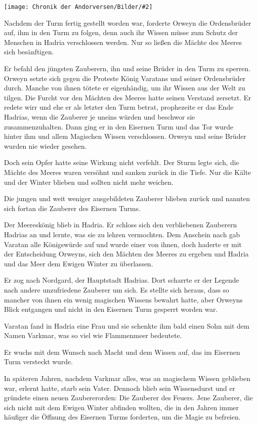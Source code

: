 \documentclass[10pt, a4paper, oneside]{book}
\newcommand{\bildmitts}[2][height=0.32\textwidth,width=0.48\textwidth,keepaspectratio]{%
    \begin{center}
        \texttt{[image: Chronik der Andorversen/Bilder/\#2]}
    \end{center}
}
\begin{document}
\begin{multicols}{2}
\bildmitts{Die Zwei Orden Bild 1.jpg}

Nachdem der Turm fertig gestellt worden war, forderte Orweyn die Ordensbrüder auf, ihm in den Turm zu folgen, denn auch ihr Wissen müsse zum Schutz der Menschen in Hadria verschlossen werden. Nur so ließen die Mächte des Meeres sich besänftigen.\bigskip

Er befahl den jüngsten Zauberern, ihn und seine Brüder in den Turm zu sperren. Orweyn setzte sich gegen die Proteste König Varatans und seiner Ordensbrüder durch. Manche von ihnen tötete er eigenhändig, um ihr Wissen aus der Welt zu tilgen. Die Furcht vor den Mächten des Meeres hatte seinen Verstand zersetzt. Er redete wirr und ehe er als letzter den Turm betrat, prophezeite er das Ende Hadrias, wenn die Zauberer je uneins würden und beschwor sie zusammenzuhalten. Dann ging er in den Eisernen Turm und das Tor wurde hinter ihm und allem Magischen Wissen verschlossen. Orweyn und seine Brüder wurden nie wieder gesehen.\bigskip

Doch sein Opfer hatte seine Wirkung nicht verfehlt. Der Sturm legte sich, die Mächte des Meeres waren versöhnt und sanken zurück in die Tiefe. Nur die Kälte und der Winter blieben und sollten nicht mehr weichen.\bigskip

Die jungen und weit weniger ausgebildeten Zauberer blieben zurück und nannten sich fortan die Zauberer des Eisernen Turms.\bigskip

Der Meereskönig blieb in Hadria. Er schloss sich den verbliebenen Zauberern Hadrias an und lernte, was sie zu lehren vermochten. Dem Anschein nach gab Varatan alle Königswürde auf und wurde einer von ihnen, doch haderte er mit der Entscheidung Orweyns, sich den Mächten des Meeres zu ergeben und Hadria und das Meer dem Ewigen Winter zu überlassen.\bigskip

Er zog nach Nordgard, der Hauptstadt Hadrias. Dort scharrte er der Legende nach andere unzufriedene Zauberer um sich. Es stellte sich heraus, dass so mancher von ihnen ein wenig magischen Wissens bewahrt hatte, aber Orweyns Blick entgangen  und nicht in den Eisernen Turm gesperrt worden war.\bigskip

Varatan fand in Hadria eine Frau und sie schenkte ihm bald einen Sohn mit dem Namen Varkmar, was so viel wie Flammenmeer bedeutete.\bigskip

Er wuchs mit dem Wunsch nach Macht und dem Wissen auf, das im Eisernen Turm versteckt wurde.\bigskip

In späteren Jahren, nachdem Varkmar alles, was an magischem Wissen geblieben war, erlernt hatte, starb sein Vater. Dennoch blieb sein Wissensdurst und er gründete einen neuen Zaubererorden: Die Zauberer des Feuers. Jene Zauberer, die sich nicht mit dem Ewigen Winter abfinden wollten, die in den Jahren immer häufiger die Öffnung des Eisernen Turms forderten, um die Magie zu befreien.\bigskip


\end{multicols}
\end{document}
